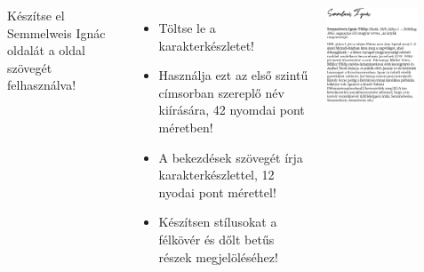 \begin{frame}
  \begin{columns}[c]
      Készítse el Semmelweis Ignác oldalát a  oldal szövegét felhasználva!
      \begin{itemize}
        \item Töltse le a  karakterkészletet!
        \item Használja ezt az első szintű címsorban szereplő név kiírására, 42 nyomdai pont méretben!
        \item A bekezdések szövegét írja  karakterkészlettel, 12 nyodai pont mérettel!
        \item Készítsen stílusokat a félkövér és dőlt betűs részek megjelöléséhez!
      \end{itemize}
      \begin{exampleblock}{}
        \begin{center}
          \includegraphics[width=0.7\textwidth]{semmelweis.png}
        \end{center}
      \end{exampleblock}
  \end{columns}
\end{frame}

